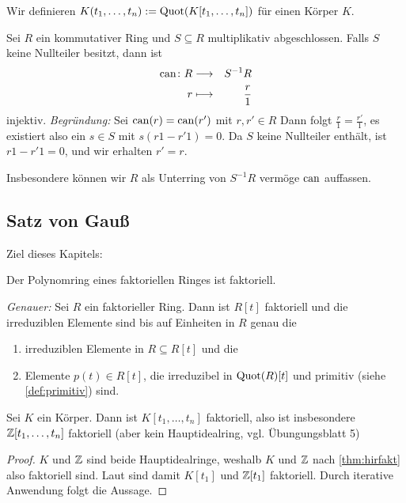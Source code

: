 \documentclass[12pt,a4paper]{scrartcl}
\begin{document}
Wir definieren $K(t_1,\dots,t_n) := \operatorname{Quot}(K[t_1,\dots,t_n])$ für einen Körper $K$.


\begin{bem}
	Sei $R$ ein kommutativer Ring und $S\subseteq R$ multiplikativ abgeschlossen. Falls $S$ keine Nullteiler besitzt, dann ist
	\begin{eqnarray*}
		 \operatorname{can}\colon R &\longrightarrow& S^{-1}R\\
		 r & \longmapsto& \frac r1
	\end{eqnarray*}
	injektiv. \emph{Begründung:} Sei $\operatorname{can}(r) = \operatorname{can}(r')$ mit $r,r'\in R$ Dann folgt $\frac r1 = \frac {r'}1$, es existiert also ein $ s\in S$ mit $ s(r1-r'1) = 0$. Da $S$ keine Nullteiler enthält, ist $r1 -r'1 = 0$, und wir erhalten $r' = r$.
	
	Insbesondere können wir $R$ als Unterring von $S^{-1}R$ vermöge $\operatorname{can}$ auffassen.
\end{bem}



\subsection{Satz von Gauß}
Ziel dieses Kapitels:
\begin{satz}\label{thm:gauss}
	Der Polynomring eines faktoriellen Ringes ist faktoriell.
	
	
	\emph{Genauer:} Sei $R$ ein faktorieller Ring. Dann ist $R[t]$ faktoriell und die irreduziblen Elemente sind bis auf Einheiten in $R$ genau die
	\begin{enumerate}[label=(\alph*)]
		\item irreduziblen Elemente in $R\subseteq R[t]$ und die \label{enumi:gauss:a}
		\item Elemente $p(t) \in R[t]$, die irreduzibel in $\operatorname{Quot}(R)[t]$ und primitiv (siehe \cref{def:primitiv}) sind. \label{enumi:gauss:b}
	\end{enumerate}
\end{satz}

\begin{kor}
	Sei $K$ ein Körper. Dann ist $K[t_1,\dots,t_n]$ faktoriell, also ist insbesondere $\mathbb Z[t_1,\dots, t_n]$ faktoriell (aber kein Hauptidealring, vgl. Übungungsblatt 5)
\end{kor}

\begin{proof} $K$ und $\mathbb Z$ sind beide Hauptidealringe, weshalb $K$ und $\mathbb Z$ nach \cref{thm:hirfakt} also faktoriell sind. Laut  sind damit $K[t_1]$ und $\mathbb Z[t_1]$ faktoriell. Durch iterative Anwendung folgt die Aussage.
\end{proof}
\end{document}
